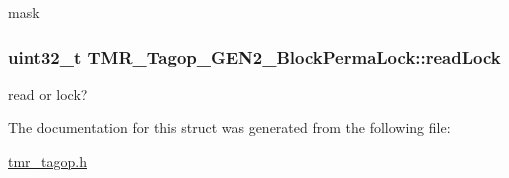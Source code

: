 mask \hypertarget{struct_t_m_r___tagop___g_e_n2___block_perma_lock_8b72f2a7c57cc5a375c2c56cca086097}{
\subsubsection[{readLock}]{\setlength{\rightskip}{0pt plus 5cm}uint32\_\-t {\bf TMR\_\-Tagop\_\-GEN2\_\-BlockPermaLock::readLock}}}
\label{struct_t_m_r___tagop___g_e_n2___block_perma_lock_8b72f2a7c57cc5a375c2c56cca086097}


read or lock? 

The documentation for this struct was generated from the following file:\begin{CompactItemize}
\item 
\hyperlink{tmr__tagop_8h}{tmr\_\-tagop.h}\end{CompactItemize}
